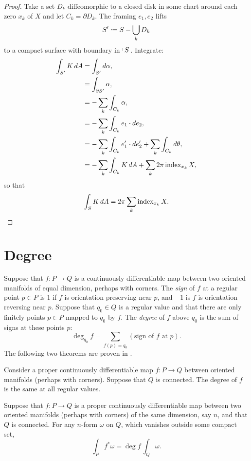 \begin{proof}
Take a set \(D_k\) diffeomorphic to a closed disk in some chart around each zero \(x_k\) of \(X\) and let \(C_k=\partial D_k\).
The framing \(e_1, e_2\) lifts 
\[
S'\defeq S - \bigcup_k D_k
\]
to a compact surface with boundary in \(\left\ulcorner\!S\right.\).
Integrate:
\begin{align*}
\int_{S'} K \, dA
&= \int_{S'} d \alpha,
\\
&= \int_{\partial S'} \alpha,
\\
&= -\sum_k \int_{C_k} \alpha, \\
&= -\sum_k \int_{C_k} e_1 \cdot de_2, \\
&= -\sum_k \int_{C_k} e_1' \cdot de_2' + \sum_k \int_{C_k} d \theta,
\\
&= -\sum_k \int_{C_k} K \, dA + \sum_k 2 \pi \operatorname{index}_{x_k} X,
\end{align*}
so that
\[
\int_S K \, dA = 2 \pi \sum_k \operatorname{index}_{x_k} X.
\]
\end{proof}

\section{Degree}
Suppose that \(f \colon P \to Q\) is a continuously differentiable map between two oriented manifolds of equal dimension, perhaps with corners.  
The \emph{sign}
of \(f\) at a regular point \(p \in P\) is \(1\) if \(f\) is orientation preserving near \(p\), and \(-1\) is \(f\) is orientation reversing near \(p\).
Suppose that \(q_0 \in Q\) is a regular value and that there are only finitely points \(p \in P\) mapped to \(q_0\) by \(f\).
The \emph{degree} of \(f\) above \(q_0\) is the sum of signs at these points \(p\):
\[
\deg_{q_0} f = \sum_{f(p)=q_0} \left(\text{sign of \(f\) at \(p\)}\right).
\]
The following two theorems are proven in \cite{McKay:2018}.
\begin{theorem}
Consider a proper continuously differentiable map \(f \colon P \to Q\) between oriented manifolds (perhaps with corners). 
Suppose that \(Q\) is connected. 
The degree of \(f\) is the same at all regular values.
\end{theorem}
\begin{theorem}
Suppose that \(f \colon P \to Q\) is a proper continuously differentiable map 
between two oriented manifolds (perhaps with corners) of the same dimension, say \(n\), and that \(Q\) is connected. 
For any \(n\)-form \(\omega\) on \(Q\), which vanishes outside some compact set,
\[
\int_P f^* \omega = \deg f \, \int_Q \omega.
\]
\end{theorem}

